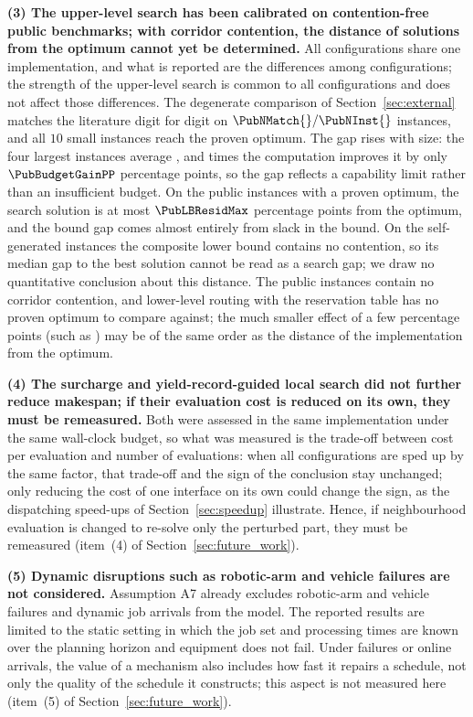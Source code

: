 \textbf{(3) The upper-level search has been calibrated on contention-free public benchmarks; with corridor contention, the distance of solutions from the optimum cannot yet be determined.}
All configurations share one implementation, and what is reported are the differences among configurations; the strength of the upper-level search is common to all configurations and does not affect those differences. The degenerate comparison of Section~\ref{sec:external} matches the literature digit for digit on $\PubNMatch{}/\PubNInst{}$ instances, and all $10$ small instances reach the proven optimum. The gap rises with size: the four largest instances average \PubGapBig{}, and \PubBudgetRatio{} times the computation improves it by only $\PubBudgetGainPP$ percentage points, so the gap reflects a capability limit rather than an insufficient budget.
On the \PubNOpt{} public instances with a proven optimum, the search solution is at most $\PubLBResidMax$ percentage points from the optimum, and the bound gap comes almost entirely from slack in the bound. On the self-generated instances the composite lower bound contains no contention, so its median gap \LBGapMed{} to the best solution cannot be read as a search gap; we draw no quantitative conclusion about this distance.
The public instances contain no corridor contention, and lower-level routing with the reservation table has no proven optimum to compare against; the much smaller effect of a few percentage points (such as \GainProbeLoop{}) may be of the same order as the distance of the implementation from the optimum.

\textbf{(4) The surcharge and yield-record-guided local search did not further reduce makespan; if their evaluation cost is reduced on its own, they must be remeasured.}
Both were assessed in the same implementation under the same wall-clock budget, so what was measured is the trade-off between cost per evaluation and number of evaluations: when all configurations are sped up by the same factor, that trade-off and the sign of the conclusion stay unchanged; only reducing the cost of one interface on its own could change the sign, as the dispatching speed-ups of Section~\ref{sec:speedup} illustrate.
Hence, if neighbourhood evaluation is changed to re-solve only the perturbed part, they must be remeasured (item~(4) of Section~\ref{sec:future_work}).

\textbf{(5) Dynamic disruptions such as robotic-arm and vehicle failures are not considered.}
Assumption A7 already excludes robotic-arm and vehicle failures and dynamic job arrivals from the model. The reported results are limited to the static setting in which the job set and processing times are known over the planning horizon and equipment does not fail. Under failures or online arrivals, the value of a mechanism also includes how fast it repairs a schedule, not only the quality of the schedule it constructs; this aspect is not measured here (item~(5) of Section~\ref{sec:future_work}).

